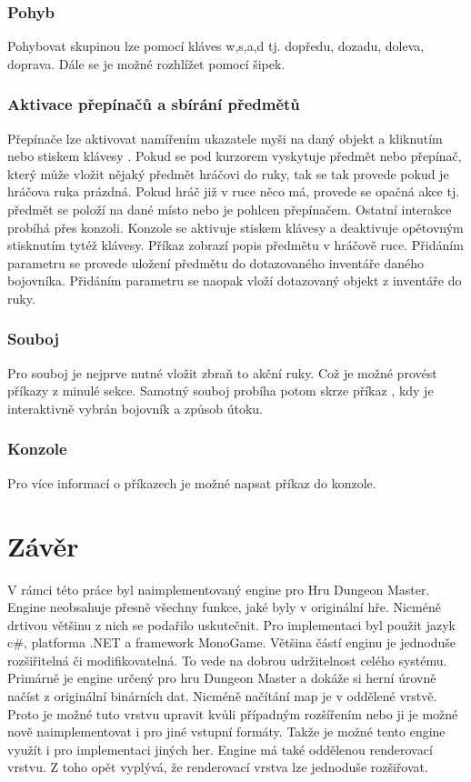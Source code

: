 \subsection{Pohyb}
Pohybovat skupinou lze pomocí kláves w,s,a,d tj. dopředu, dozadu, doleva, doprava. Dále se je možné rozhlížet pomocí šipek.

\subsection{Aktivace přepínačů a sbírání předmětů}
Přepínače lze aktivovat namířením ukazatele myši na daný objekt a kliknutím nebo stiskem klávesy . Pokud
se pod kurzorem vyskytuje předmět nebo  přepínač, který může vložit nějaký předmět hráčovi do ruky, tak se tak provede pokud je
hráčova ruka prázdná. Pokud hráč již v ruce něco má, provede se opačná akce tj. předmět se položí na dané místo nebo je 
pohlcen přepínačem. Ostatní interakce probíhá přes konzoli. Konzole se aktivuje stiskem klávesy  a deaktivuje opětovným
stisknutím tytéž klávesy. Příkaz  zobrazí popis předmětu v hráčově ruce. Přidáním parametru  se provede
uložení předmětu do dotazovaného inventáře daného bojovníka. Přidáním parametru  se naopak vloží dotazovaný objekt z inventáře
do ruky.

\subsection{Souboj}
Pro souboj je nejprve nutné vložit zbraň to akční ruky. Což je možné provést příkazy z minulé sekce.
Samotný souboj probíha potom skrze příkaz , kdy je interaktivně vybrán bojovník a způsob útoku.

\subsection{Konzole}
Pro více informací o příkazech je možné napsat příkaz  do konzole.

\chapter*{Závěr}

V rámci této práce byl naimplementovaný engine pro Hru Dungeon Master. Engine 
neobsahuje přesně všechny funkce, jaké byly v originální hře. Nicméně drtivou většinu
z nich se podařilo uskutečnit. Pro implementaci byl použit jazyk c#, platforma .NET
a framework MonoGame. Většina částí enginu je jednoduše rozšiřitelná či modifikovatelná.
To vede na dobrou udržitelnost celého systému. Primárně je engine určený pro hru 
Dungeon Master a dokáže si herní úrovně načíst z originální binárních dat. Nicméně
načítání map je v oddělené vrstvě. Proto je možné tuto vrstvu upravit kvůli případným rozšířením nebo ji je možné
 nově naimplementovat i pro 
jiné vstupní formáty. Takže je možné tento engine využít i pro implementaci jiných her.
Engine má také oddělenou renderovací vrstvu. Z toho opět vyplývá, že renderovací vrstva lze jednoduše
rozšiřovat.




